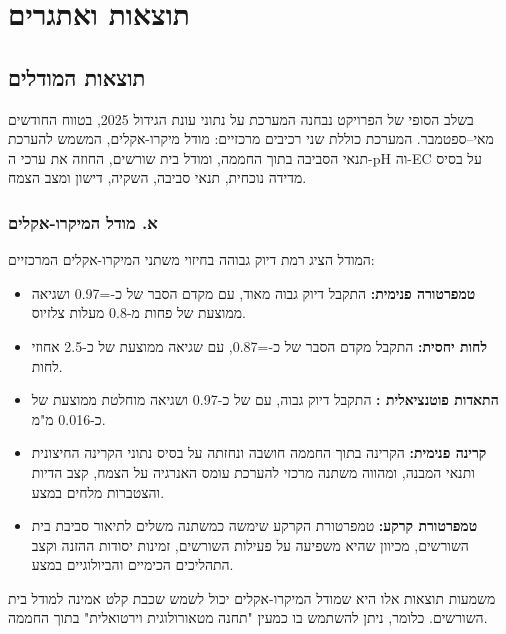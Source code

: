 \section{תוצאות ואתגרים}

\subsection{תוצאות המודלים}
בשלב הסופי של הפרויקט נבחנה המערכת על נתוני עונת הגידול 2025, בטווח החודשים מאי--ספטמבר. המערכת כוללת שני רכיבים מרכזיים: מודל מיקרו-אקלים, המשמש להערכת תנאי הסביבה בתוך החממה, ומודל בית שורשים, החוזה את ערכי ה-pH וה-EC על בסיס מדידה נוכחית, תנאי סביבה, השקיה, דישון ומצב הצמח.

\subsubsection*{א. מודל המיקרו-אקלים}
המודל הציג רמת דיוק גבוהה בחיזוי משתני המיקרו-אקלים המרכזיים:

\begin{itemize}
    \item \textbf{טמפרטורה פנימית:} התקבל דיוק גבוה מאוד, עם מקדם הסבר של כ-\Rtwo{}=0.97 ושגיאה ממוצעת של פחות מ-0.8 מעלות צלזיוס.
    \item \textbf{לחות יחסית:} התקבל מקדם הסבר של כ-\Rtwo{}=0.87, עם שגיאה ממוצעת של כ-2.5 אחוזי לחות.
    \item \textbf{התאדות פוטנציאלית :} התקבל דיוק גבוה, עם \Rtwo{} של כ-0.97 ושגיאה מוחלטת ממוצעת של כ-0.016 מ"מ.
    \item \textbf{קרינה פנימית:} הקרינה בתוך החממה חושבה ונחזתה על בסיס נתוני הקרינה החיצונית ותנאי המבנה, ומהווה משתנה מרכזי להערכת עומס האנרגיה על הצמח, קצב הדיות והצטברות מלחים במצע.
    \item \textbf{טמפרטורת קרקע:} טמפרטורת הקרקע שימשה כמשתנה משלים לתיאור סביבת בית השורשים, מכיוון שהיא משפיעה על פעילות השורשים, זמינות יסודות ההזנה וקצב התהליכים הכימיים והביולוגיים במצע.
\end{itemize}

משמעות תוצאות אלו היא שמודל המיקרו-אקלים יכול לשמש שכבת קלט אמינה למודל בית השורשים. כלומר, ניתן להשתמש בו כמעין "תחנה מטאורולוגית וירטואלית" בתוך החממה.


